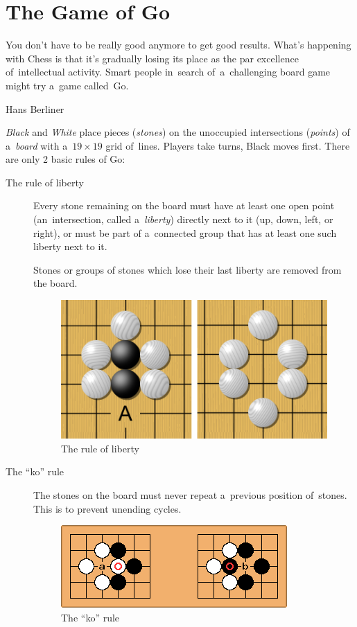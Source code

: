 \section{The Game of Go}
\label{sec:Go}
\epigraph{
  You don't have to be really good anymore to get good results.
  What's happening with Chess is that it's gradually losing its place as the par excellence of~intellectual activity.
  Smart people in~search of~a~challenging board game might try a~game called~Go.
}{Hans Berliner}
\emph{Black} and \emph{White} place pieces (\emph{stones}) on the unoccupied intersections (\emph{points}) of a~\emph{board} with a~$19\times19$ grid of~lines.
Players take turns, Black moves first.
There are only 2 basic rules of Go:
\begin{description}
  \item [The rule of liberty]
    Every stone remaining on the board must have at least one open point (an~intersection, called a~\emph{liberty}) directly next to it (up, down, left, or right), or must be part of a~connected group that has at least one such liberty next to it.

    Stones or groups of stones which lose their last liberty are removed from the board.
    \begin{figure}[H]
      \centering
      \includegraphics[width=.5\textwidth]{../img/Go_rule_of_liberty.png}
      \caption{The rule of liberty}
      \label{fig:Go-rule-liberty}
    \end{figure}

  \item [The ``ko'' rule]
    The stones on the board must never repeat a~previous position of~stones.
    This is to prevent unending cycles.
    \begin{figure}[H]
      \centering
      \includegraphics[width=.5\textwidth]{../img/Go_ko_rule.png}
      \caption{The ``ko'' rule}
      \label{fig:Go-Ko-rule}
    \end{figure}
\end{description}

